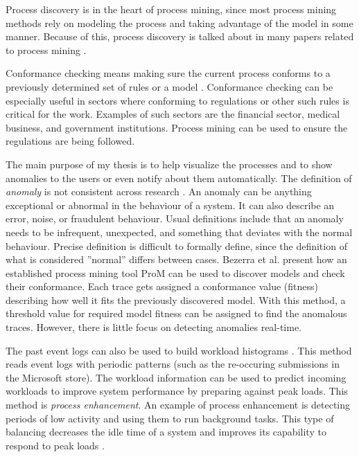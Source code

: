 Process discovery is in the heart of process mining, since most process mining methods rely on modeling the process and taking advantage of the model in some manner.
Because of this, process discovery is talked about in many papers related to process mining \cite{chomyat2016process, de2016general, van2013discovering, van2015extracting, van2016process,bezerra2009anomaly}.

Conformance checking means making sure the current process conforms to a previously determined set of rules or a model \cite{chomyat2016process}.
Conformance checking can be especially useful in sectors where conforming to regulations or other such rules is critical for the work.
Examples of such sectors are the financial sector, medical business, and government institutions.
Process mining can be used to ensure the regulations are being followed.

The main purpose of my thesis is to help visualize the processes and to show anomalies to the users or even notify about them automatically.
The definition of \textit{anomaly} is not consistent across research \cite{bezerra2009anomaly}. 
An anomaly can be anything exceptional or abnormal in the behaviour of a system. 
It can also describe an error, noise, or fraudulent behaviour.
Usual definitions include that an anomaly needs to be infrequent, unexpected, and something that deviates with the normal behaviour.
Precise definition is difficult to formally define, since the definition of what is considered ''normal'' differs between cases. 
Bezerra et al. \cite{bezerra2009anomaly} present how an established process mining tool ProM can be used to discover models and check their conformance.
Each trace gets assigned a conformance value (fitness) describing how well it fits the previously discovered model.
With this method, a threshold value for required model fitness can be assigned to find the anomalous traces.
However, there is little focus on detecting anomalies real-time.

The past event logs can also be used to build workload histograms \cite{getta2014mining}.
This method reads event logs with periodic patterns (such as the re-occuring submissions in the Microsoft store).
The workload information can be used to predict incoming workloads to improve system performance by preparing against peak loads.
This method is \textit{process enhancement}. 
An example of process enhancement is detecting periods of low activity and using them to run background tasks.
This type of balancing decreases the idle time of a system and improves its capability to respond to peak loads \cite{getta2014mining}.
